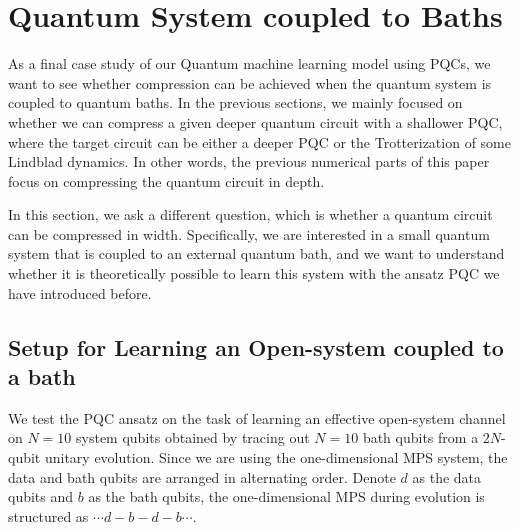\documentclass[%
 reprint,
superscriptaddress,
 amsmath,amssymb,
 aps,
]{revtex4-2}
\begin{document}


\section{Quantum System coupled to Baths}
As a final case study of our Quantum machine learning model using PQCs, we want to see whether compression can be achieved when the quantum system is coupled to quantum baths. In the previous sections, we mainly focused on whether we can compress a given deeper quantum circuit with a shallower PQC, where the target circuit can be either a deeper PQC or the Trotterization of some Lindblad dynamics. In other words, the previous numerical parts of this paper focus on compressing the quantum circuit in depth.

In this section, we ask a different question, which is whether a quantum circuit can be compressed in width. Specifically, we are interested in a small quantum system that is coupled to an external quantum bath, and we want to understand whether it is theoretically possible to learn this system with the ansatz PQC we have introduced before.

\subsection{Setup for Learning an Open-system coupled to a bath}
\label{sec:setup_for_learning_bath}

We test the PQC ansatz on the task of learning an effective open-system channel on $N=10$ system qubits obtained by tracing out $N=10$ bath qubits from a $2N$-qubit unitary evolution. Since we are using the one-dimensional MPS system, the data and bath qubits are arranged in alternating order. Denote $d$ as the data qubits and $b$ as the bath qubits, the one-dimensional MPS during evolution is structured as $\cdots d-b-d-b\cdots$.
\end{document}
